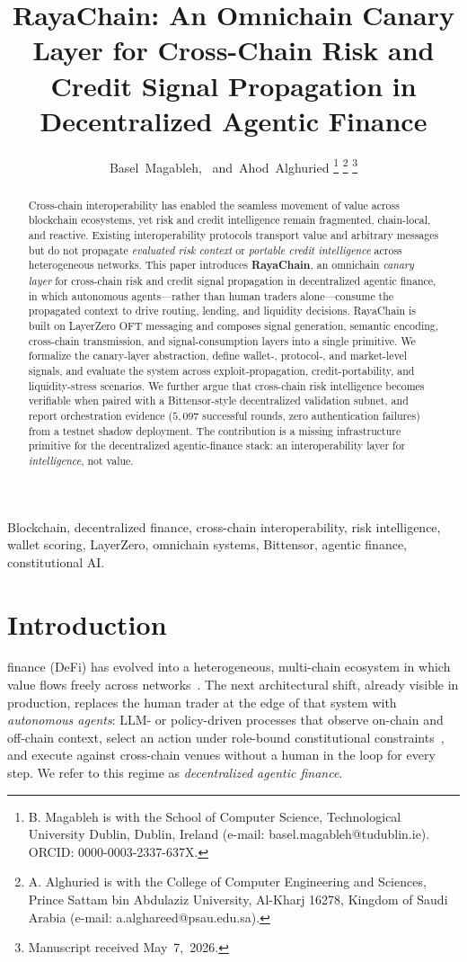 \documentclass[journal]{IEEEtran}
\title{RayaChain: An Omnichain Canary Layer for
       Cross-Chain Risk and Credit Signal Propagation in
       Decentralized Agentic Finance}
\author{Basel~Magableh,~\IEEEmembership{Member,~IEEE,}
        and~Ahod~Alghuried%
\thanks{B. Magableh is with the School of Computer Science, Technological
University Dublin, Dublin, Ireland (e-mail: basel.magableh@tudublin.ie).
ORCID: 0000-0003-2337-637X.}%
\thanks{A. Alghuried is with the College of Computer Engineering and
Sciences, Prince Sattam bin Abdulaziz University, Al-Kharj 16278,
Kingdom of Saudi Arabia (e-mail: a.alghareed@psau.edu.sa).}%
\thanks{Manuscript received May~7,~2026.}}
\begin{document}
\maketitle

\begin{abstract}
Cross-chain interoperability has enabled the seamless movement of value
across blockchain ecosystems, yet risk and credit intelligence remain
fragmented, chain-local, and reactive. Existing interoperability
protocols transport value and arbitrary messages but do not propagate
\emph{evaluated risk context} or \emph{portable credit intelligence}
across heterogeneous networks. This paper introduces \textbf{RayaChain},
an omnichain \emph{canary layer} for cross-chain risk and credit signal
propagation in decentralized agentic finance, in which autonomous
agents---rather than human traders alone---consume the propagated
context to drive routing, lending, and liquidity decisions. RayaChain is
built on LayerZero OFT messaging and composes signal generation,
semantic encoding, cross-chain transmission, and signal-consumption
layers into a single primitive. We formalize the canary-layer
abstraction, define wallet-, protocol-, and market-level signals, and
evaluate the system across exploit-propagation, credit-portability, and
liquidity-stress scenarios. We further argue that cross-chain risk
intelligence becomes verifiable when paired with a Bittensor-style
decentralized validation subnet, and report orchestration evidence
($5{,}097$ successful rounds, zero authentication failures) from a
testnet shadow deployment. The contribution is a missing infrastructure
primitive for the decentralized agentic-finance stack: an
interoperability layer for \emph{intelligence}, not value.
\end{abstract}

\begin{IEEEkeywords}
Blockchain, decentralized finance, cross-chain interoperability, risk
intelligence, wallet scoring, LayerZero, omnichain systems, Bittensor,
agentic finance, constitutional AI.
\end{IEEEkeywords}

\section{Introduction}

 finance (DeFi) has evolved into a
heterogeneous, multi-chain ecosystem in which value flows freely across
networks~\cite{BelchiorVGC22,00330023}. The next architectural shift,
already visible in production, replaces the human trader at the
edge of that system with \emph{autonomous agents}: LLM- or policy-driven
processes that observe on-chain and off-chain context, select an action
under role-bound constitutional
constraints~\cite{bai2022constitutional}, and execute against
cross-chain venues without a human in the loop for every step. We refer
to this regime as \emph{decentralized agentic finance}.
\end{document}
